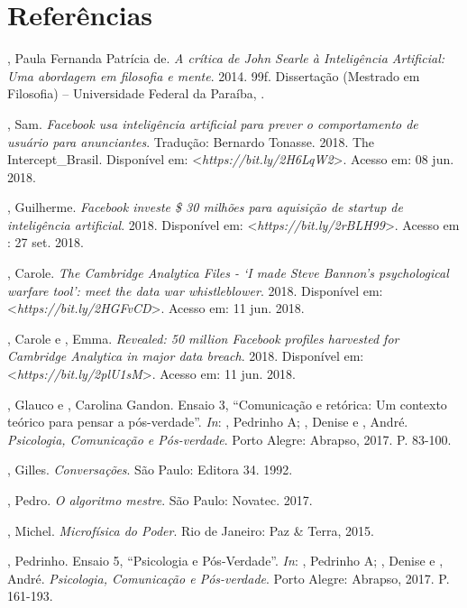 \section{Referências}

\begin{Parskip}
, Paula Fernanda Patrícia de. \emph{A crítica de John Searle à
Inteligência Artificial: Uma abordagem em filosofia e mente}.
2014. 99f. Dissertação (Mestrado em Filosofia) -- Universidade Federal
da Paraíba, .

, Sam. \emph{Facebook usa inteligência artificial para prever o
comportamento de usuário para anunciantes}. Tradução: Bernardo
Tonasse. 2018. The Intercept\_Brasil. Disponível em:
\textless{}\emph{https://bit.ly/2H6LqW2}\textgreater{}. Acesso em: 08 jun. 2018.

, Guilherme. \emph{Facebook investe \$ 30 milhões para
aquisição de startup de inteligência artificial}. 2018. Disponível em:
\textless{}\emph{https://bit.ly/2rBLH99}\textgreater{}. Acesso em : 27 set. 2018.

, Carole. \emph{The Cambridge Analytica Files - `I made
Steve Bannon's psychological warfare tool': meet the data war
whistleblower}. 2018. Disponível em: \textless{}\emph{https://bit.ly/2HGFvCD}\textgreater{}.
Acesso em: 11 jun. 2018.

, Carole e , Emma. \emph{Revealed: 50 million
Facebook profiles harvested for Cambridge Analytica in major data
breach}. 2018. Disponível em: \textless{}\emph{https://bit.ly/2plU1sM}\textgreater{}. Acesso em: 11 jun. 2018.

, Glauco e , Carolina Gandon. Ensaio 3, ``Comunicação e
retórica: Um contexto teórico para pensar a pós-verdade''. \emph{In}:
, Pedrinho A; , Denise e , André. \emph{Psicologia,
Comunicação e Pós-verdade}. Porto Alegre: Abrapso, 2017. P. 83-100.

, Gilles. \emph{Conversações}. São Paulo: Editora 34. 1992.

, Pedro. \emph{O algoritmo mestre}. São Paulo: Novatec. 2017.

, Michel. \emph{Microfísica do Poder}. Rio de Janeiro: Paz \&
Terra, 2015.

, Pedrinho. Ensaio 5, ``Psicologia e Pós-Verdade''. \emph{In}:
, Pedrinho A; , Denise e , André. \emph{Psicologia,
Comunicação e Pós-verdade}. Porto Alegre: Abrapso, 2017. P. 161-193.


\end{Parskip}
